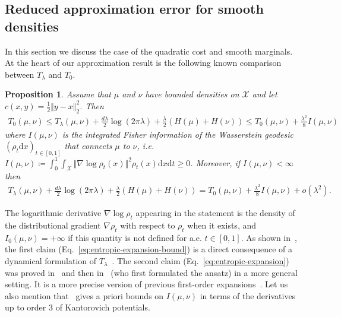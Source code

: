 \documentclass[11pt]{article}
\newcommand{\Xx}{\mathcal{X}}
\renewcommand{\d}{\mathrm{d}}
\newtheorem{proposition}[theorem]{Proposition}
\begin{document}
\subsection{Reduced approximation error for smooth densities}
In this section we discuss the case of the quadratic cost and smooth marginals. At the heart of our approximation result is the following known comparison between $T_\lambda$ and $T_0$.

\begin{proposition}\label{prop:expansion}
Assume that $\mu$ and $\nu$ have bounded densities on $\Xx$ and let $c(x,y)=\frac12 \Vert y-x\Vert_2^2$. Then
\begin{align}\label{eq:entropic-expansion-bound}
T_0(\mu,\nu)\leq T_\lambda(\mu,\nu) + \frac{d\lambda}{2}  \log(2\pi\lambda) + \frac{\lambda}{2} (H(\mu)+H(\nu)) \leq   T_0(\mu,\nu) + \frac{\lambda^2}{8}I(\mu,\nu) 
\end{align}
where $I(\mu,\nu)$ is the integrated Fisher information of the Wasserstein geodesic $(\rho_t\d x)_{t\in [0,1]}$ that connects $\mu$ to $\nu$, i.e. $I(\mu,\nu)\coloneqq \int_0^1\int_\Xx \Vert \nabla \log \rho_t(x)\Vert^2\rho_t(x)\d x\d t\geq 0$. Moreover, if $I(\mu,\nu)<\infty$ then
\begin{align}\label{eq:entropic-expansion}
 T_\lambda(\mu,\nu) + \frac{d\lambda}{2}  \log(2\pi\lambda) + \frac{\lambda}{2} (H(\mu)+H(\nu)) =   T_0(\mu,\nu) + \frac{\lambda^2}{8}I(\mu,\nu)  +o(\lambda^2).
\end{align}
\end{proposition}
The logarithmic derivative $\nabla \log \rho_t$ appearing in the statement is the density of the distributional gradient $\nabla \rho_t$ with respect to $\rho_t$ when it exists, and $I_0(\mu,\nu)=+\infty$ if this quantity is not defined for a.e. $t\in [0,1]$. As shown in~\cite[Thm.~1]{chizat2020faster}, the first claim (Eq.~\eqref{eq:entropic-expansion-bound}) is a direct consequence of a dynamical formulation of $T_\lambda$~\cite{chen2016relation}. The second claim (Eq.~\eqref{eq:entropic-expansion}) was proved in~\cite[Lem.~1]{chizat2020faster} and then in~\cite{conforti2021formula} (who first formulated the ansatz) in a more general setting. It is a more precise version of previous first-order expansions~\cite{duong2013wasserstein, erbar2015large, pal2019difference}. Let us also mention that~\cite[Prop.~1]{chizat2020faster} gives a priori bounds on $I(\mu,\nu)$ in terms of the derivatives up to order $3$ of Kantorovich potentials. 
\end{document}

